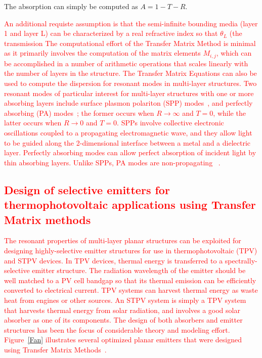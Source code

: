 \documentclass[10pt,letterpaper]{article}
\begin{document}
The absorption can simply be computed as $A= 1-T-R$.  \textcolor{red}{An additional requiste assumption is that the semi-infinite bounding media (layer 1 and layer L)
can be characterized by a real refractive index so that $\theta_L$ (the transmission
  The computational
effort of the Transfer Matrix Method is minimal as it primarily involves the computation of the matrix elements $M_{i,j}$, which can 
be accomplished in a number of arithmetic operations that scales linearly with the number of layers in the structure.
The Transfer Matrix Equations can also be used to compute the dispersion for resonant modes in multi-layer structures.  Two
resonant modes of particular interest for multi-layer structures with one or more absorbing layers include surface plasmon polariton 
(SPP) modes~\cite{WH_PSSb_1987,Maier,Novotny,AP_NatMat_2010,FHR_SciRep_2015}, 
and perfectly absorbing (PA) modes~\cite{DD_APL_2009,KSL_APL_2012,
KBG_NatMat_2013,FHR_SciRep_2015}; the former occurs 
when $R \rightarrow \infty$ and   $T=0$, while the 
latter occurs
when $R \rightarrow 0$ and   $T=0$.  SPPs involve collective electronic oscillations coupled to a propagating electromagnetic wave,
and they allow light to be guided along the 2-dimensional interface between a metal and a dielectric layer.  Perfectly absorbing
modes can allow perfect absorption of incident light by thin absorbing layers.  Unlike SPPs, PA modes are 
non-propagating~\cite{FHR_SciRep_2015}
.
\subsection{Design of selective emitters for thermophotovoltaic applications using Transfer Matrix methods}
The resonant properties of multi-layer planar structures can be exploited for designing highly-selective emitter structures for use in
thermophotovoltaic (TPV) and STPV devices.  In TPV devices, thermal energy is transferred to a 
spectrally-selective emitter
structure.  The radiation wavelength of the emitter should be well matched to a PV cell bandgap so that its thermal emission can be efficiently converted
to electrical current.  TPV systems can harvest thermal energy as waste heat from engines or other sources.  An STPV system is simply 
a TPV system that harvests thermal energy from solar radiation, and involves a good solar absorber as one of its components.
The design of both absorbers and emitter structures has been the focus of considerable theory and modeling effort.
Figure~\ref{Fan} illustrates several optimized planar emitters that were designed using Transfer Matrix Methods~\cite{BN_JApplPhys_2005, LZ_JApplPhys_2006, RF_OptExp_2009}.

}
\end{document}
